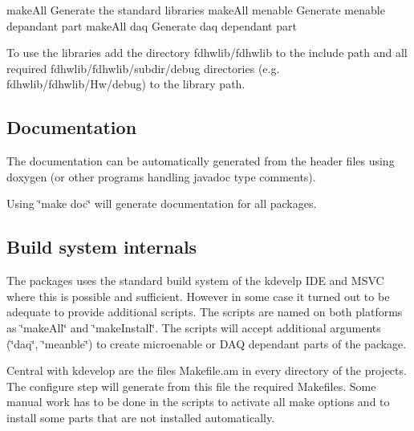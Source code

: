 \begin{DoxyVerb}makeAll                  Generate the standard libraries
makeAll menable          Generate menable depandant part
makeAll daq              Generate daq dependant part
\end{DoxyVerb}
 \begin{DoxyVerb}To use the libraries add the directory fdhwlib/fdhwlib to the include
path and all required fdhwlib/fdhwlib/\<subdir\>/debug directories
(e.g. fdhwlib/fdhwlib/Hw/debug) to the library path.
\end{DoxyVerb}
\hypertarget{index_builddoc}{}\subsection{Documentation}\label{index_builddoc}
The documentation can be automatically generated from the header files using doxygen (or other programs handling javadoc type comments).

Using \char`\"{}make doc\char`\"{} will generate documentation for all packages.\hypertarget{index_buildinternals}{}\subsection{Build system internals}\label{index_buildinternals}
The packages uses the standard build system of the kdevelp I\-D\-E and M\-S\-V\-C where this is possible and sufficient. However in some case it turned out to be adequate to provide additional scripts. The scripts are named on both platforms as \char`\"{}make\-All\char`\"{} and \char`\"{}make\-Install\char`\"{}. The scripts will accept additional arguments (\char`\"{}daq\char`\"{}, \char`\"{}meanble\char`\"{}) to create microenable or D\-A\-Q dependant parts of the package.

Central with kdevelop are the files Makefile.\-am in every directory of the projects. The configure step will generate from this file the required Makefiles. Some manual work has to be done in the scripts to activate all make options and to install some parts that are not installed automatically.

